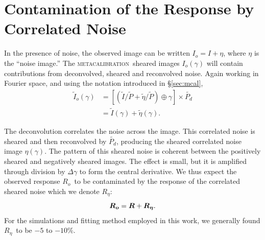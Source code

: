 \documentclass[iop]{emulateapj}
\newcommand{\mcal}{\textsc{metacalibration}}
\newcommand{\mcalR}{\mbox{\boldmath $R$}}
\newcommand{\mcalRo}{\mbox{\boldmath $R_o$}}
\newcommand{\mcalRnoise}{\mbox{\boldmath $R_\eta$}}
\newcommand{\Itild}{\mbox{$\widetilde{I}$}}
\newcommand{\ntil}{\mbox{$\widetilde{\eta}$}}
\newcommand{\Ptil}{\mbox{$\widetilde{P}$}}
\newcommand{\Ptild}{\mbox{$\widetilde{P_d}$}}
\newcommand{\SSs}{$\left<R_{S}R_{S}\right>$}
\begin{document}

\section{Contamination of the Response by Correlated Noise} \label{sec:contam}

In the presence of noise, the observed image can be written $I_o=I+\eta$, where $\eta$
is the ``noise image.''  The \mcal\ sheared images $I_o(\gamma)$ will contain
contributions from deconvolved, sheared and reconvolved noise. Again working
in Fourier space, and using the notation introduced in \S \ref{sec:mcal},
\begin{align}
    \Itild_o(\gamma) &= \left[ \left( \Itild/\Ptil + \ntil/\Ptil \right) \oplus \gamma \right] \times \Ptild  \nonumber \\
    &= \Itild(\gamma) + \ntil(\gamma).
\end{align}

The deconvolution correlates the noise across the image.  This correlated
noise is sheared and then reconvolved by \Ptild, producing the
sheared correlated noise image $\eta(\gamma)$.  The pattern of this sheared
noise is coherent between the positively sheared and negatively sheared images.
The effect is small, but it is amplified through division by $\Delta \gamma$ to
form the central derivative.  We thus expect the observed response \mcalRo\ to
be contaminated by the response of the correlated sheared noise which
we denote \mcalRnoise:
\begin{equation}
    \mbox{\mcalRo}  =  \mcalR + \mbox{\mcalRnoise}.
\end{equation}
For the simulations and fitting method employed in this work, we generally
found \mcalRnoise\ to be $-5$ to $-10$\%.
\end{document}
